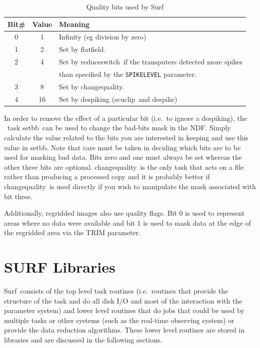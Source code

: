 \documentclass[twoside,11pt]{article}
\newcommand{\Kappa}{\xref{{\sc{Kappa}}}{sun95}{}}
\newcommand{\task}[1]{{\sf #1}}
\newcommand{\param}[1]{{\tt #1}}
\newcommand{\chgqual}{\xref{\task{change\_quality}}{sun216}{CHANGE_QUALITY}}
\newcommand{\resw}{\xref{\task{reduce\_switch}}{sun216}{REDUCE_SWITCH}}
\newcommand{\flatf}{\xref{\task{flatfield}}{sun216}{FLATFIELD}}
\newcommand{\despike}{\xref{\task{despike}}{sun216}{DESPIKE}}
\newcommand{\scuclip}{\xref{\task{scuclip}}{sun216}{SCUCLIP}}
\newcommand{\setbb}{\xref{\task{setbb}}{sun95}{SETBB}}
\newcommand{\scusoft}          {{\sc Surf}}
\newcommand{\xref}[3]{#1}
\renewcommand{\_}{\texttt{\symbol{95}}}
\begin{document}
\begin{table}
\caption{Quality bits used by \scusoft}
\label{badbits}
\begin{center}
\begin{tabular}{ccl}
\hline\hline
Bit\# & Value & Meaning \\ \hline
0 & 1  &Infinity (eg division by zero) \\
1 & 2  &Set by \flatf.\\
2 & 4  &Set by \resw\ if the transputers detected more spikes\\
  &    & than specified by the \param{SPIKE\_LEVEL} parameter.\\
3 & 8  &Set by \chgqual.\\
4 & 16 &Set by despiking (\scuclip\ and \despike)\\ \hline\hline
\end{tabular}
\end{center}
\end{table}

In order to remove the effect of a particular bit (i.e.\ to ignore a
despiking), the \Kappa\ task \setbb\ can be used to change the bad-bits
mask in the NDF. Simply calculate the value related to the bits you are
interested in keeping and use this value in \setbb. Note that care must
be taken in deciding which bits are to be used for masking bad data. Bits zero
and one must always be set whereas the other three bits are
optional. \chgqual\ is the only task that acts on a file rather than producing
a processed copy and it is probably better if \chgqual\ is used directly if
you wish to manipulate the mask associated with bit three.

Additionally, regridded images also use quality flags. Bit 0 is used
to represent areas where no data were available and bit 1 is used to mask
data at the edge of the regridded area via the TRIM parameter.

\section{SURF Libraries}

\scusoft\ consists of the top level task routines (i.e.\ routines that
provide the structure of the task and do all disk I/O and most of the
interaction with the parameter system) and lower level
routines that do jobs that could be used by multiple tasks or other systems
(such as the real-time observing system) or provide the data reduction
algorithms. These lower level routines are stored in libraries and are
discussed in the following sections.
\end{document}
